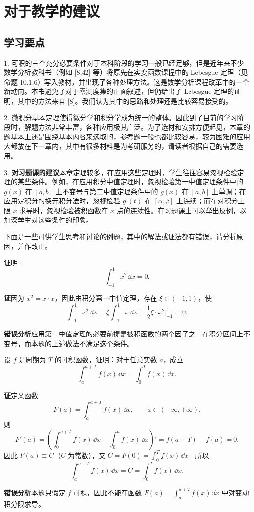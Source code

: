 \section{对于教学的建议}

\subsection{学习要点}

1. 可积的三个充分必要条件对于本科阶段的学习一般已经足够。但是近年来不少数学分析教科书（例如 [8,42] 等）将原先在实变函数课程中的 Lebesgue 定理（见命题 10.1.6）写入教材，并出现了各种处理方法。这是数学分析课程改革中的一个新动向。本书避免了对于零测度集的正面叙述，但仍给出了 Lebesgue 定理的证明，其中的方法来自 [8]。我们认为其中的思路和处理还是比较容易接受的。

2. 微积分基本定理使得微分学和积分学成为统一的整体。因此到了目前的学习阶段时，解题方法非常丰富，各种应用极其广泛。为了选材和安排方便起见，本章的题基本上还是围绕基本内容来选取的，参考题一般也都比较容易，较为困难的应用大都放在下一章内，其中有很多材料是为考研服务的，请读者根据自己的需要选用。

3. \textbf{对习题课的建议}\quad 本章定理较多，在应用这些定理时，学生往往容易忽视检验定理的某些条件。例如，在应用积分中值定理时，忽视检验第一中值定理条件中的 $g(x)$ 在 $[a,b]$ 上不变号与第二中值定理条件中的 $g(x)$ 在 $[a,b]$ 上单调；在应用定积分的换元积分法时，忽视检验 $g'(t)$ 在 $[\alpha,\beta]$ 上连续；而在对积分上限 $x$ 求导时，忽视检验被积函数在 $x$ 点的连续性。在习题课上可以举出反例，以加深学生对这些条件的印象。

下面是一些可供学生思考和讨论的例题，其中的解法或证法都有错误，请分析原因，并作改正。

\begin{xexample}[10.5.1]
证明：
\[
  \int_{-1}^1x^2\,\dd x=0.
\]
\end{xexample}
\begin{xsolution}
\textbf{证}\quad 因为 $x^2=x\cdot x$，因此由积分第一中值定理，存在 $\xi\in(-1,1)$，使
\[
  \int_{-1}^1x^2\,\dd x
  =\xi\int_{-1}^1x\,\dd x
  =\frac12\xi\cdot x^2\Big|_{-1}^1=0.
\]

\textbf{错误分析}\quad 应用第一中值定理的必要前提是被积函数的两个因子之一在积分区间上不变号，而本题的上述做法不满足这个条件。
\end{xsolution}

\begin{xexample}[10.5.2]
设 $f$ 是周期为 $T$ 的可积函数，证明：对于任意实数 $a$，成立
\[
  \int_a^{a+T}f(x)\,\dd x=\int_0^T f(x)\,\dd x.
\]
\end{xexample}
\begin{xsolution}
\textbf{证}\quad 定义函数
\[
  F(a)=\int_a^{a+T}f(x)\,\dd x,\qquad a\in(-\infty,+\infty).
\]
则
\[
  F'(a)=\left(\int_0^{a+T}f(x)\,\dd x-\int_0^a f(x)\,\dd x\right)'
  =f(a+T)-f(a)=0.
\]
因此 $F(a)\equiv C$（$C$ 为常数），又 $C=F(0)=\int_0^T f(x)\,\dd x$，所以
\[
  \int_a^{a+T}f(x)\,\dd x=C=\int_0^T f(x)\,\dd x.
\]

\textbf{错误分析}\quad 本题只假定 $f$ 可积，因此不能在函数 $F(a)=\int_a^{a+T}f(x)\,\dd x$ 中对变动积分限求导。
\end{xsolution}

